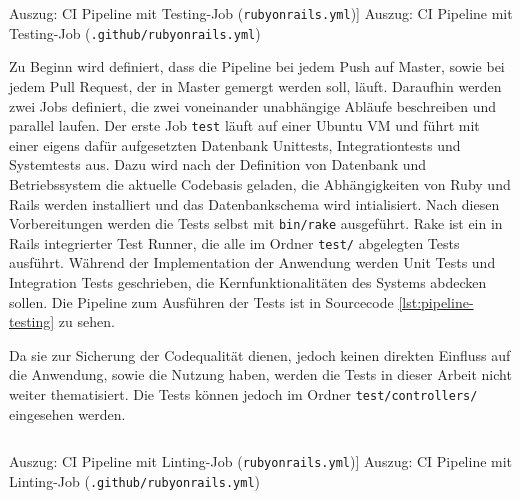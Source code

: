 \begin{listing}[!ht]
\inputminted[firstline=8, lastline=32, linenos]{yaml}{Listings/rubyonrails.yml}

\caption
    [Auszug: CI Pipeline mit Testing-Job (\texttt{rubyonrails.yml})]
    {Auszug: CI Pipeline mit Testing-Job (\texttt{.github/rubyonrails.yml})}

\label{lst:pipeline-testing}
\end{listing}

Zu Beginn wird definiert, dass die Pipeline bei jedem Push auf Master, sowie bei jedem Pull Request, der in Master gemergt werden soll, läuft. Daraufhin werden zwei Jobs definiert, die zwei voneinander unabhängige Abläufe beschreiben und parallel laufen. Der erste Job \texttt{test} läuft auf einer Ubuntu VM und führt mit einer eigens dafür aufgesetzten Datenbank Unittests, Integrationtests und Systemtests aus. Dazu wird nach der Definition von Datenbank und Betriebssystem die aktuelle Codebasis geladen, die Abhängigkeiten von Ruby und Rails werden installiert und das Datenbankschema wird intialisiert. Nach diesen Vorbereitungen werden die Tests selbst mit \texttt{bin/rake} ausgeführt. Rake ist ein in Rails integrierter Test Runner, die alle im Ordner \texttt{test/} abgelegten Tests ausführt. Während der Implementation der Anwendung werden Unit Tests und Integration Tests geschrieben, die Kernfunktionalitäten des Systems abdecken sollen. Die Pipeline zum Ausführen der Tests ist in Sourcecode \ref{lst:pipeline-testing} zu sehen.

Da sie zur Sicherung der Codequalität dienen, jedoch keinen direkten Einfluss auf die Anwendung, sowie die Nutzung haben, werden die Tests in dieser Arbeit nicht weiter thematisiert. Die Tests können jedoch im Ordner \texttt{test/controllers/} eingesehen werden.

\begin{listing}[!ht]
\inputminted[firstline=34, lastline=48, linenos]{yaml}{Listings/rubyonrails.yml}

\caption
    [Auszug: CI Pipeline mit Linting-Job (\texttt{rubyonrails.yml})]
    {Auszug: CI Pipeline mit Linting-Job (\texttt{.github/rubyonrails.yml})}
    
\label{lst:pipeline-linting}
\end{listing}



